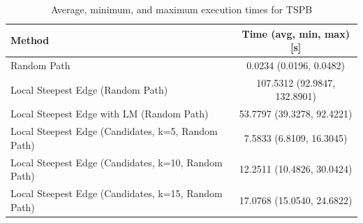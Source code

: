 \begin{table}[h!]
\centering
\begin{tabular}{lc}
\hline
Method & Time (avg, min, max) [s] \\
\hline
Random Path & 0.0234 (0.0196, 0.0482) \\
Local Steepest Edge (Random Path) & 107.5312 (92.9847, 132.8901) \\
Local Steepest Edge with LM (Random Path) & 53.7797 (39.3278, 92.4221) \\
Local Steepest Edge (Candidates, k=5, Random Path) & 7.5833 (6.8109, 16.3045) \\
Local Steepest Edge (Candidates, k=10, Random Path) & 12.2511 (10.4826, 30.0424) \\
Local Steepest Edge (Candidates, k=15, Random Path) & 17.0768 (15.0540, 24.6822) \\
\hline
\end{tabular}
\caption{Average, minimum, and maximum execution times for TSPB}
\label{tab:TSPB_timings}
\end{table}
